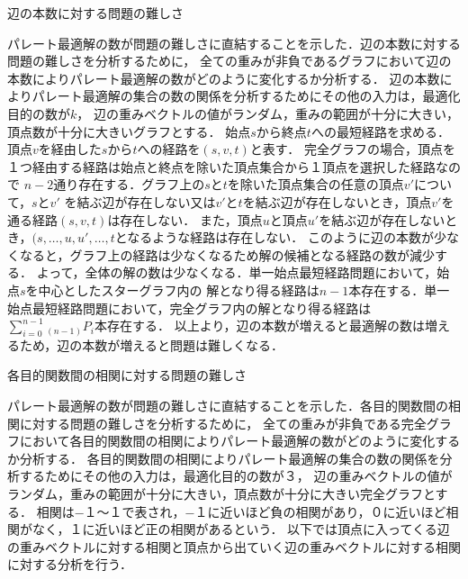 \documentclass[12pt]{optlab-bachelor}
\begin{document}
\begin{description}
  \item[辺の本数に対する問題の難しさ]
\end{description}

パレート最適解の数が問題の難しさに直結することを示した．辺の本数に対する問題の難しさを分析するために，
全ての重みが非負であるグラフにおいて辺の本数によりパレート最適解の数がどのように変化するか分析する．
辺の本数によりパレート最適解の集合の数の関係を分析するためにその他の入力は，最適化目的の数が$k$，
辺の重みベクトルの値がランダム，重みの範囲が十分に大きい，頂点数が十分に大きいグラフとする．
始点$s$から終点$t$への最短経路を求める．頂点$v$を経由した$s$から$t$への経路を$(s,v,t)$と表す．
完全グラフの場合，頂点を１つ経由する経路は始点と終点を除いた頂点集合から１頂点を選択した経路なので
$n-2$通り存在する．グラフ上の$s$と$t$を除いた頂点集合の任意の頂点$v'$について，$s$と$v'$
を結ぶ辺が存在しない又は$v'$と$t$を結ぶ辺が存在しないとき，頂点$v'$を通る経路$(s,v,t)$は存在しない．
また，頂点$u$と頂点$u'$を結ぶ辺が存在しないとき，$(s,\ldots, u, u', \ldots , t$となるような経路は存在しない．
このように辺の本数が少なくなると，グラフ上の経路は少なくなるため解の候補となる経路の数が減少する．
よって，全体の解の数は少なくなる．単一始点最短経路問題において，始点$s$を中心としたスターグラフ内の
解となり得る経路は$n-1$本存在する．単一始点最短経路問題において，完全グラフ内の解となり得る経路は
$\displaystyle \sum_{i=0}^{n-1} {}_{(n-1)}P_i$本存在する．
以上より，辺の本数が増えると最適解の数は増えるため，辺の本数が増えると問題は難しくなる．

\begin{description}
  \item[各目的関数間の相関に対する問題の難しさ]
\end{description}

パレート最適解の数が問題の難しさに直結することを示した．各目的関数間の相関に対する問題の難しさを分析するために，
全ての重みが非負である完全グラフにおいて各目的関数間の相関によりパレート最適解の数がどのように変化するか分析する．
各目的関数間の相関によりパレート最適解の集合の数の関係を分析するためにその他の入力は，最適化目的の数が３，
辺の重みベクトルの値がランダム，重みの範囲が十分に大きい，頂点数が十分に大きい完全グラフとする．
相関は−１〜１で表され，−１に近いほど負の相関があり，０に近いほど相関がなく，１に近いほど正の相関があるという．
以下では頂点に入ってくる辺の重みベクトルに対する相関と頂点から出ていく辺の重みベクトルに対する相関に対する分析を行う．
\end{document}
